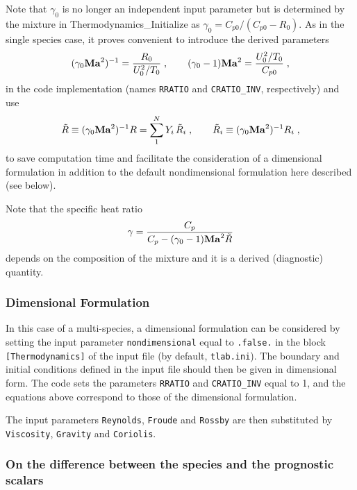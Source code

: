 Note that $\gamma_0$ is no longer an independent input parameter but is determined by the mixture in {Thermodynamics\_Initialize} as $\gamma_0=C_{p0}/(C_{p0}-R_0)$. As in the single species case, it proves convenient to introduce the derived parameters
\begin{equation}
    (\gamma_0\mathrm{\bf Ma}^2)^{-1}=\frac{R_0}{U^2_0/T_0}\;,\qquad (\gamma_0-1)\mathrm{\bf Ma}^2 =\frac{U_0^2/T_0}{C_{p0}} \;,
\end{equation}
in the code implementation (names \texttt{RRATIO} and \texttt{CRATIO\_INV}, respectively) and use 
\begin{equation}
    \tilde{R}\equiv (\gamma_0\mathrm{\bf Ma}^2)^{-1}R=\sum_1^NY_i\,\tilde{R}_i\;,\qquad\tilde{R}_i\equiv (\gamma_0\mathrm{\bf Ma}^2)^{-1}R_i
    \;,
\end{equation}
to save computation time and facilitate the consideration of a dimensional formulation in addition to the default nondimensional formulation here described (see below). 

Note that the specific heat ratio
\begin{equation}
    \gamma=\frac{C_p}{C_p-(\gamma_0-1)\mathrm{\bf Ma}^2\tilde{R}}
\end{equation}
depends on the composition of the mixture and it is a derived (diagnostic) quantity.

\subsubsection{Dimensional Formulation}

In this case of a multi-species, a dimensional formulation can be considered by setting the input parameter \texttt{nondimensional} equal to \texttt{.false.} in the block \texttt{[Thermodynamics]} of the input file (by default, \texttt{tlab.ini}). The boundary and initial conditions defined in the input file should then be given in dimensional form. The code sets the parameters \texttt{RRATIO} and \texttt{CRATIO\_INV} equal to 1, and the equations above correspond to those of the dimensional formulation. 

The input parameters \texttt{Reynolds}, \texttt{Froude} and \texttt{Rossby} are then substituted by \texttt{Viscosity}, \texttt{Gravity} and \texttt{Coriolis}.

\subsubsection{On the difference between the species and the prognostic scalars}

